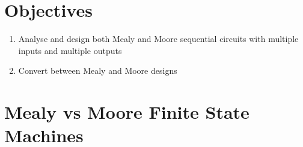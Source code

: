 
\section{Objectives}
\begin{enumerate}
  \item Analyse and design both Mealy and Moore sequential circuits with multiple inputs and multiple outputs
  \item Convert between Mealy and Moore designs
\end{enumerate}

\section{Mealy vs Moore Finite State Machines}
\begin{definition}~\cite[Sec~3.4]{harris2022digital}
\end{definition}
\vspace{5em}

\begin{definition}~\cite[Sec~3.4.3]{harris2022digital}
\end{definition}
\vspace{5em}

\begin{definition}~\cite[Sec~3.4.3]{harris2022digital}
\end{definition}
\vspace{5em}


% 

